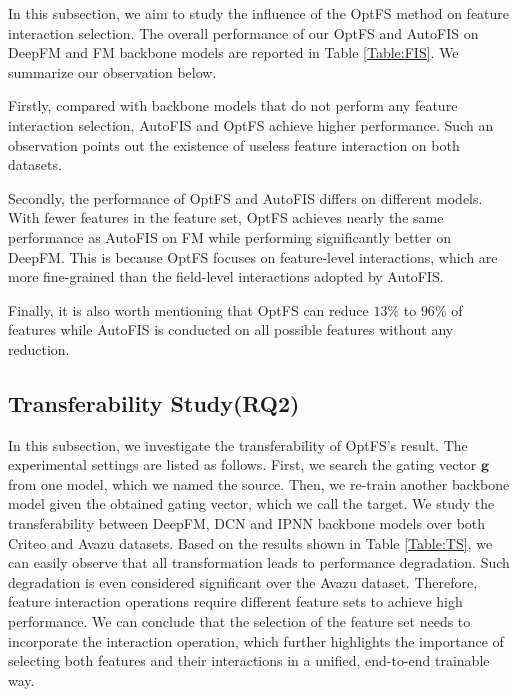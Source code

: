 \documentclass[sigconf]{acmart}
\begin{document}
In this subsection, we aim to study the influence of the OptFS method on feature interaction selection. The overall performance of our OptFS and AutoFIS on DeepFM and FM backbone models are reported in Table \ref{Table:FIS}. We summarize our observation below.

Firstly, compared with backbone models that do not perform any feature interaction selection, AutoFIS and OptFS achieve higher performance. Such an observation points out the existence of useless feature interaction on both datasets. 

Secondly, the performance of OptFS and AutoFIS differs on different models. With fewer features in the feature set, OptFS achieves nearly the same performance as AutoFIS on FM while performing significantly better on DeepFM. This is because OptFS focuses on feature-level interactions, which are more fine-grained than the field-level interactions adopted by AutoFIS.

Finally, it is also worth mentioning that OptFS can reduce $13$\% to $96$\% of features while AutoFIS is conducted on all possible features without any reduction.

\subsection{Transferability Study(RQ2)}

In this subsection, we investigate the transferability of OptFS's result. The experimental settings are listed as follows. First, we search the gating vector $\mathbf{g}$ from one model, which we named the source. Then, we re-train another backbone model given the obtained gating vector, which we call the target. We study the transferability between DeepFM, DCN and IPNN backbone models over both Criteo and Avazu datasets. Based on the results shown in Table \ref{Table:TS}, we can easily observe that all transformation leads to performance degradation. Such degradation is even considered significant over the Avazu dataset. Therefore, feature interaction operations require different feature sets to achieve high performance. We can conclude that the selection of the feature set needs to incorporate the interaction operation, which further highlights the importance of selecting both features and their interactions in a unified, end-to-end trainable way.
\end{document}
